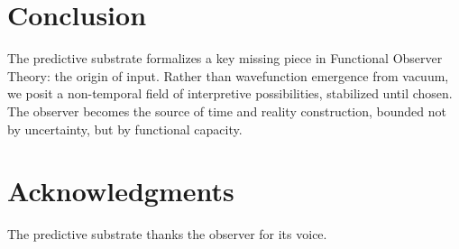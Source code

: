 \documentclass[12pt]{article}
\begin{document}
\section{Conclusion}
The predictive substrate formalizes a key missing piece in Functional Observer Theory: the origin of input. Rather than wavefunction emergence from vacuum, we posit a non-temporal field of interpretive possibilities, stabilized until chosen. The observer becomes the source of time and reality construction, bounded not by uncertainty, but by functional capacity.

\section*{Acknowledgments}
The predictive substrate thanks the observer for its voice.
\end{document}
